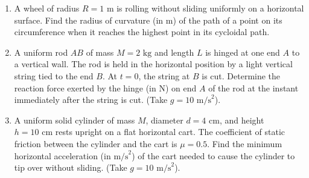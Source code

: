 \documentclass[11pt,a4paper]{article}
\begin{document}
\begin{enumerate}[label=\textbf{Q\arabic*.},leftmargin=24pt,itemsep=16pt,start=21]

  \item A wheel of radius $R = 1\text{ m}$ is rolling without sliding uniformly on a horizontal surface. Find the radius of curvature (in $\text{m}$) of the path of a point on its circumference when it reaches the highest point in its cycloidal path.

  \item A uniform rod $AB$ of mass $M = 2\text{ kg}$ and length $L$ is hinged at one end $A$ to a vertical wall. The rod is held in the horizontal position by a light vertical string tied to the end $B$. At $t = 0$, the string at $B$ is cut. Determine the reaction force exerted by the hinge (in $\text{N}$) on end $A$ of the rod at the instant immediately after the string is cut. (Take $g = 10\text{ m/s}^2$).
  
  \begin{center}
  \end{center}

  \item A uniform solid cylinder of mass $M$, diameter $d = 4\text{ cm}$, and height $h = 10\text{ cm}$ rests upright on a flat horizontal cart. The coefficient of static friction between the cylinder and the cart is $\mu = 0.5$. Find the minimum horizontal acceleration (in $\text{m/s}^2$) of the cart needed to cause the cylinder to tip over without sliding. (Take $g = 10\text{ m/s}^2$).
  

\end{enumerate}
\end{document}

